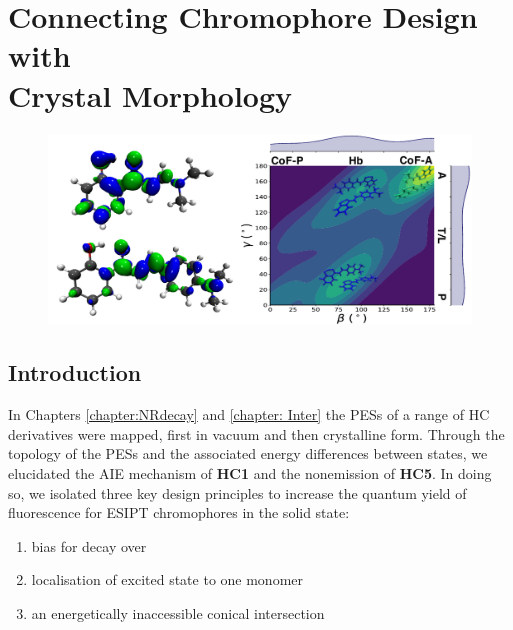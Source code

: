 \chapter[Connecting Chromophore Design with Crystal Morphology]{Connecting Chromophore Design with\\ Crystal Morphology}
\label{chapter: Connecting}
\begin{figure}[H]
\centering
  \includegraphics[width=0.7\linewidth]{5ConnectingCrystalStructure/3toc.pdf}
\end{figure}
\section{Introduction}\label{section: Connecting_Introduction}

In Chapters \ref{chapter:NRdecay} and \ref{chapter: Inter} the \acp{PES} of a range of \ac{HC} derivatives were mapped, first in vacuum and then crystalline form. Through the topology of the PESs and the associated energy differences between states, we elucidated the AIE mechanism of \textbf{HC1} and the nonemission of \textbf{HC5}. In doing so, we isolated three key design principles to increase the quantum yield of fluorescence for ESIPT chromophores in the solid state:
\begin{enumerate}
    \item bias for \Kstar{} decay over \Estar{}
    \item localisation of excited state to one monomer 
    \item an energetically inaccessible conical intersection
\end{enumerate}

